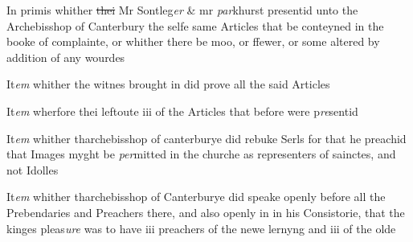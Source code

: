 \documentclass[12pt, a4paper]{book}
\begin{document}
		\ifthenelse{\isodd{\thepage}}
		{\reversemarginpar}
		{\normalmarginpar}
		In primis whither \sout{thei }
            			Mr Sontleg\textit{er} \& mr \textit{par}khurst
			 presentid unto the Archebisshop of Canterbury the selfe same Articles that be conteyned in the booke of complainte, or whither there be moo, or ffewer, or some altered by addition of any wourdes
            		
            			
				\marginpar[\vspace{0.5cm}{\textcolor{Gray}{2}}]{}
			
            			
		\ifthenelse{\isodd{\thepage}}
		{\reversemarginpar}
		{\normalmarginpar}
		It\textit{em} whither the witnes brought in did prove all the said Articles
            		
            				
				\marginpar[\vspace{0.5cm}{\textcolor{Gray}{3}}]{}
			
            				
		\ifthenelse{\isodd{\thepage}}
		{\reversemarginpar}
		{\normalmarginpar}
		It\textit{em} wherfore thei leftoute iii of the Articles that before were p\textit{re}sentid
            		
            		
            			
				\marginpar[\vspace{0.5cm}{\textcolor{Gray}{4}}]{}
			
            			
		\ifthenelse{\isodd{\thepage}}
		{\reversemarginpar}
		{\normalmarginpar}
		It\textit{em} whither tharchebisshop of canterburye did rebuke Serls for that he preachid that Images myght be \textit{per}mitted in the churche as representers of sainctes, and not Idolles
            		
            		
            			
				\marginpar[\vspace{0.5cm}{\textcolor{Gray}{5}}]{}
			
            			
		\ifthenelse{\isodd{\thepage}}
		{\reversemarginpar}
		{\normalmarginpar}
		It\textit{em} whither tharchebisshop of Canterburye did speake openly before all the Prebendaries and Preachers there, and also openly in in his Consistorie, that the kinges pleas\textit{ure} was to have iii preachers of the newe lernyng and iii of the olde 
            		
            		
            			
				\marginpar[\vspace{0.5cm}{\textcolor{Gray}{6}}]{}
			
\end{document}
